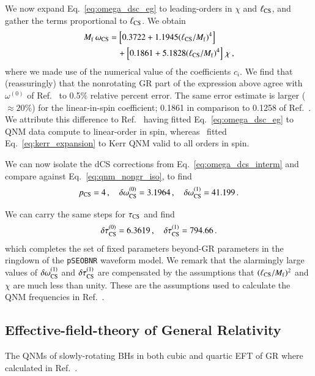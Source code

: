 \documentclass[twocolumn,
               prd,
               aps,
               superscriptaddress,
               tightenlines,
               nofootinbib,
               eqsecnum,
               amsfonts,
               amsmath,
               longbibliography]{revtex4-1}
\newcommand{\pSEOB}{\texttt{pSEOBNR}}
\begin{document}
We now expand Eq.~\eqref{eq:omega_dsc_eg} to leading-orders in $\chi$ and $\ell_{\rm CS}$, and
gather the terms proportional to $\ell_{\rm CS}$.
%
We obtain
%
\begin{align}
    M_{\rm f} \, \omega_{\rm CS} &=
    \left[ 0.3722 + 1.1945 (\ell_{\rm CS} / M_{\rm f})^4 \right]
    \nonumber \\
    &\quad + \left[0.1861 + 5.1828 (\ell_{\rm CS} / M_{\rm f})^4 \right] \, \chi\,,
    \label{eq:omega_dcs_interm}
\end{align}
%
where we made use of the numerical value of the coefficients $c_{i}$.
%
We find that (reassuringly) that the nonrotating GR part of the expression above agree with $\omega^{(0)}$ of Ref.~\cite{Maselli:2019mjd}
to 0.5\% relative percent error. The same error estimate is larger ($\approx 20$\%) for the linear-in-spin coefficient;
0.1861 in comparison to 0.1258 of Ref.~\cite{Maselli:2019mjd}.
%
We attribute this difference to Ref.~\cite{Wagle:2021tam} having fitted Eq.~\eqref{eq:omega_dsc_eg} to QNM data compute to linear-order in spin, whereas~\cite{Maselli:2019mjd}
fitted Eq.~\eqref{eq:kerr_expansion} to Kerr QNM valid to all orders in spin.

We can now isolate the dCS corrections from Eq.~\eqref{eq:omega_dcs_interm} and
compare against Eq.~\eqref{eq:qnm_nongr_iso}, to find
%
\begin{equation}
p_{\rm CS} = 4\,, \quad \delta \omega^{(0)}_{\rm CS} = 3.1964\,, \quad \delta \omega^{(1)}_{\rm CS} = 41.199\,.
\label{eq:cs_omega_coefs}
\end{equation}

We can carry the same steps for $\tau_{\rm CS}$ and find
%
\begin{equation}
\delta \tau^{(0)}_{\rm CS} = 6.3619\,, \quad \delta \tau^{(1)}_{\rm CS} = 794.66\,.
\label{eq:cs_tau_coefs}
\end{equation}
%
which completes the set of fixed parameters beyond-GR parameters in the ringdown of the \pSEOB{} waveform model.
%
We remark that the alarmingly large values of $\delta \omega_{\rm CS}^{(1)}$ and $\delta \tau_{\rm CS}^{(1)}$
are compensated by the assumptions that $(\ell_{\rm CS} / M_{\rm f})^2$ and $\chi$ are much less than unity. These
are the assumptions used to calculate the QNM frequencies in Ref.~\cite{Wagle:2021tam}.

\subsection{Effective-field-theory of General Relativity}
\label{app:map_eftofgr}

The QNMs of slowly-rotating BHs in both cubic and quartic EFT of GR where calculated in Ref.~\cite{Cano:2021myl}.


\end{document}
